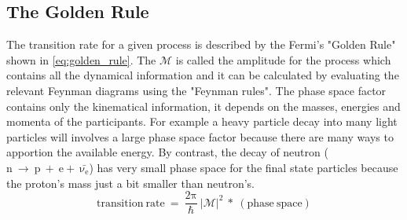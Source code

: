 \subsection{The Golden Rule}\label{subsubsec:golden_rule}
The transition rate for a given process is described by the Fermi's "Golden Rule" shown in \ref{eq:golden_rule}. The $\mathcal{M}$ is called the amplitude for the process which contains all the dynamical information and it can be calculated by evaluating the relevant Feynman diagrams using the "Feynman rules". The phase space factor contains only the kinematical information, it depends on the masses, energies and momenta of the participants. For example a heavy particle decay into many light particles will involves a large phase space factor because there are many ways to apportion the available energy. By contrast, the decay of neutron ($\mathrm{n~\rightarrow~p~+~e+~\bar{\nu_{e}}}$) has very small phase space for the final state particles because the proton's mass just a bit smaller than neutron's.
\begin{equation}
\mathrm{transition~rate~=~\frac{2\pi}{\hbar}~|\mathcal{M}|^{2}~*~(phase~space)}
\label{eq:golden_rule}
\end{equation}

